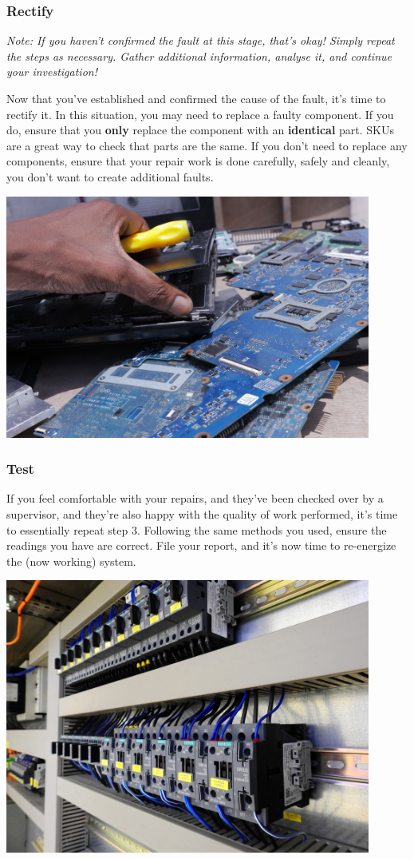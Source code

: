 \documentclass[11pt,a4paper]{article}
\begin{document}
\subsubsection{Rectify}
\textit{Note: If you haven't confirmed the fault at this stage, that's okay! Simply repeat the steps as necessary. Gather additional information, analyse it, and continue your investigation!}\par
Now that you've established and confirmed the cause of the fault, it's time to rectify it. In this situation, you may need to replace a faulty component. If you do, ensure that you \textbf{only} replace the component with an \textbf{identical} part. SKUs are a great way to check that parts are the same. If you don't need to replace any components, ensure that your repair work is done carefully, safely and cleanly, you don't want to create additional faults.
\begin{center}
  \includegraphics[width=12cm]{fix}
\end{center}
\subsubsection{Test}
If you feel comfortable with your repairs, and they've been checked over by a supervisor, and they're also happy with the quality of work performed, it's time to essentially repeat step 3. Following the same methods you used, ensure the readings you have are correct. File your report, and it's now time to re-energize the (now working) system.
\begin{center}
  \includegraphics[width=12cm]{energize}
\end{center}
\newpage
\end{document}
